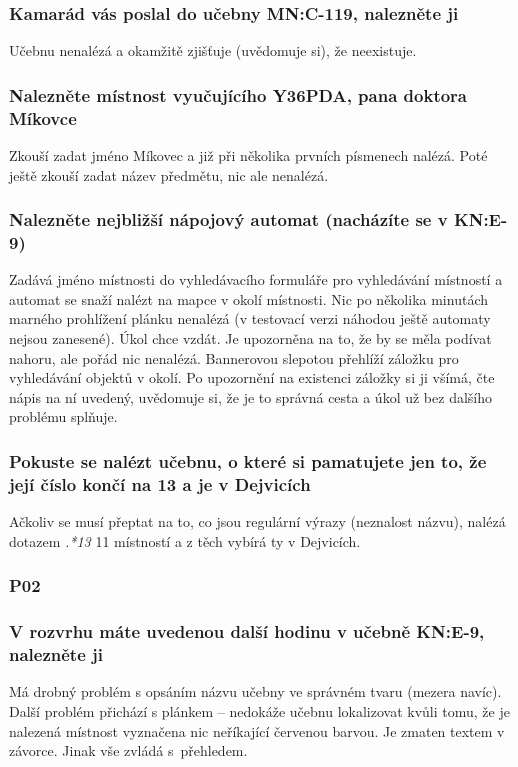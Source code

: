 \subsubsection*{Kamarád vás poslal do učebny MN:C-119, nalezněte ji}
Učebnu nenalézá a okamžitě zjišťuje (uvědomuje si), že neexistuje.
\subsubsection*{Nalezněte místnost vyučujícího Y36PDA, pana doktora Míkovce}
Zkouší zadat jméno Míkovec a již při několika prvních písmenech nalézá. Poté ještě zkouší zadat název předmětu, nic ale nenalézá.
\subsubsection*{Nalezněte nejbližší nápojový automat (nacházíte se v KN:E-9)}
Zadává jméno místnosti do vyhledávacího formuláře pro vyhledávání místností a automat se snaží nalézt na mapce v okolí místnosti. Nic po několika minutách marného prohlížení plánku nenalézá (v testovací verzi náhodou ještě automaty nejsou zanesené). Úkol chce vzdát. Je upozorněna na to, že by se měla podívat nahoru, ale pořád nic nenalézá. Bannerovou slepotou přehlíží záložku pro vyhledávání objektů v okolí. Po upozornění na existenci záložky si ji všímá, čte nápis na ní uvedený, uvědomuje si, že je to správná cesta a úkol už bez dalšího problému splňuje.
\subsubsection*{Pokuste se nalézt učebnu, o které si pamatujete jen to, že její číslo končí na 13 a je v Dejvicích}
Ačkoliv se musí přeptat na to, co jsou regulární výrazy (neznalost názvu), nalézá dotazem \emph{.*13} 11 místností a z těch vybírá ty v Dejvicích.

\subsubsection{P02}
\subsubsection*{V rozvrhu máte uvedenou další hodinu v učebně KN:E-9, nalezněte ji}
Má drobný problém s opsáním názvu učebny ve správném tvaru (mezera navíc). Další problém přichází s plánkem -- nedokáže učebnu lokalizovat kvůli tomu, že je nalezená místnost vyznačena nic neříkající červenou barvou. Je zmaten textem v závorce. Jinak vše zvládá s~přehledem.
